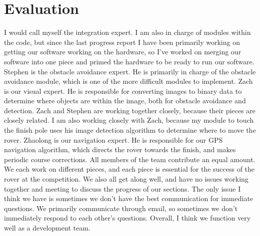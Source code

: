 \documentclass[10pt,letterpaper,onecolumn,journal]{IEEEtran}
\begin{document}
\section{Evaluation}
I would call myself the integration expert. I am also in charge of modules within the code, but since the last progress report I have been primarily working on getting our software working on the hardware, so I've worked on merging our software into one piece and primed the hardware to be ready to run our software. Stephen is the obstacle avoidance expert. He is primarily in charge of the obstacle avoidance module, which is one of the more difficult modules to implement. Zach is our visual expert. He is responsible for converting images to binary data to determine where objects are within the image, both for obstacle avoidance and detection. Zach and Stephen are working together closely, because their pieces are closely related. I am also working closely with Zach, because my module to touch the finish pole uses his image detection algorithm to determine where to move the rover. Zhaolong is our navigation expert. He is responsible for our GPS navigation algorithm, which directs the rover towards the finish, and makes periodic course corrections. All members of the team contribute an equal amount. We each work on different pieces, and each piece is essential for the success of the rover at the competition. We also all get along well, and have no issues working together and meeting to discuss the progress of our sections. The only issue I think we have is sometimes we don't have the best communication for immediate questions. We primarily communicate through email, so sometimes we don't immediately respond to each other's questions. Overall, I think we function very well as a development team. 
\end{document}
